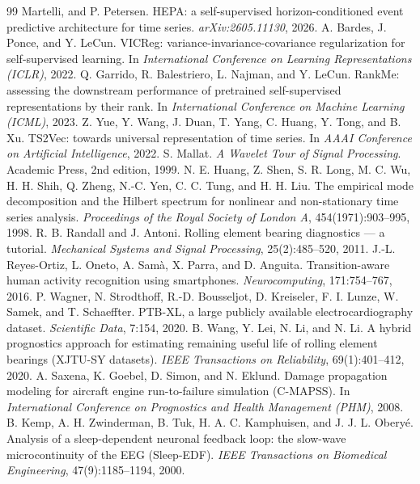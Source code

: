 \documentclass[10pt,twocolumn]{article}
\begin{document}
\begin{thebibliography}{99}
Martelli, and P. Petersen. HEPA: a self-supervised horizon-conditioned event
predictive architecture for time series. \emph{arXiv:2605.11130}, 2026.
 A. Bardes, J. Ponce, and Y. LeCun. VICReg:
variance-invariance-covariance regularization for self-supervised learning. In
\emph{International Conference on Learning Representations (ICLR)}, 2022.
 Q. Garrido, R. Balestriero, L. Najman, and Y.
LeCun. RankMe: assessing the downstream performance of pretrained
self-supervised representations by their rank. In \emph{International
Conference on Machine Learning (ICML)}, 2023.
 Z. Yue, Y. Wang, J. Duan, T. Yang, C. Huang, Y. Tong,
and B. Xu. TS2Vec: towards universal representation of time series. In
\emph{AAAI Conference on Artificial Intelligence}, 2022.
 S. Mallat. \emph{A Wavelet Tour of Signal
Processing}. Academic Press, 2nd edition, 1999.
 N. E. Huang, Z. Shen, S. R. Long, M. C. Wu, H. H.
Shih, Q. Zheng, N.-C. Yen, C. C. Tung, and H. H. Liu. The empirical mode
decomposition and the Hilbert spectrum for nonlinear and non-stationary time
series analysis. \emph{Proceedings of the Royal Society of London A},
454(1971):903--995, 1998.
 R. B. Randall and J. Antoni. Rolling element
bearing diagnostics --- a tutorial. \emph{Mechanical Systems and Signal
Processing}, 25(2):485--520, 2011.
 J.-L. Reyes-Ortiz, L. Oneto, A. Sam\`a, X.
Parra, and D. Anguita. Transition-aware human activity recognition using
smartphones. \emph{Neurocomputing}, 171:754--767, 2016.
 P. Wagner, N. Strodthoff, R.-D. Bousseljot, D.
Kreiseler, F. I. Lunze, W. Samek, and T. Schaeffter. PTB-XL, a large publicly
available electrocardiography dataset. \emph{Scientific Data}, 7:154, 2020.
 B. Wang, Y. Lei, N. Li, and N. Li. A hybrid prognostics
approach for estimating remaining useful life of rolling element bearings
(XJTU-SY datasets). \emph{IEEE Transactions on Reliability}, 69(1):401--412,
2020.
 A. Saxena, K. Goebel, D. Simon, and N. Eklund.
Damage propagation modeling for aircraft engine run-to-failure simulation
(C-MAPSS). In \emph{International Conference on Prognostics and Health
Management (PHM)}, 2008.
 B. Kemp, A. H. Zwinderman, B. Tuk, H. A. C. Kamphuisen,
and J. J. L. Obery\'e. Analysis of a sleep-dependent neuronal feedback loop:
the slow-wave microcontinuity of the EEG (Sleep-EDF). \emph{IEEE Transactions
on Biomedical Engineering}, 47(9):1185--1194, 2000.
\end{thebibliography}
\end{document}
